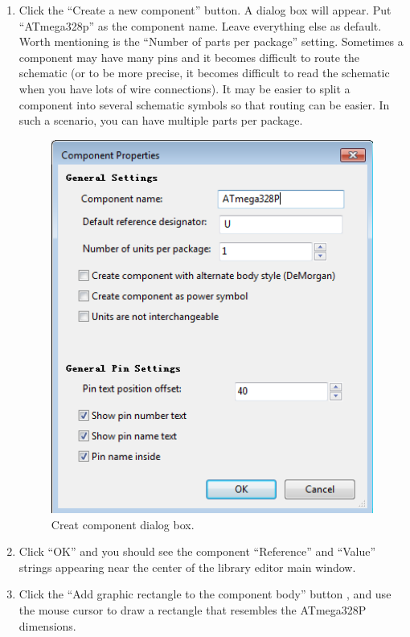 \documentclass[12pt,letterpaper]{scrartcl}
\begin{document}
\begin{enumerate}
	\item Click the ``Create a new component'' button. A dialog box will appear. Put ``ATmega328p'' as the component name. Leave everything else as default. Worth mentioning is the ``Number of parts per package'' setting. Sometimes a component may have many pins and it becomes difficult to route the schematic (or to be more precise, it becomes difficult to read the schematic when you have lots of wire connections). It may be easier to split a component into several schematic symbols so that routing can be easier. In such a scenario, you can have multiple parts per package. 
		\begin{figure}[h]
			\centering
			\includegraphics[width=5in]{create-component}
			\caption{Creat component dialog box.}
			\label{fig:create-component}
		\end{figure}
		
	\item Click ``OK'' and you should see the component ``Reference'' and ``Value'' strings appearing near the center of the library editor main window. 
	
	\item Click the ``Add graphic rectangle to the component body'' button , and use the mouse cursor to draw a rectangle that resembles the ATmega328P dimensions. 
	

\end{enumerate}
\end{document}
